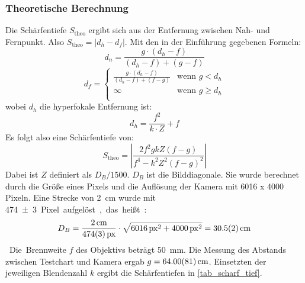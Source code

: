\documentclass[
	a4paper,
	12pt,
	pagesize,
	ngerman
]{scrartcl}
\begin{document}
	\subsubsection*{Theoretische Berechnung}
	Die Schärfentiefe $S_\text{theo}$ ergibt sich aus der Entfernung zwischen Nah- und Fernpunkt.
	Also $S_\text{theo}= |d_h - d_f|$.
	Mit den in der Einführung gegebenen Formeln: 
	\begin{equation}
		d_n = \frac{g\cdot (d_h-f)}{(d_h-f)+(g-f)}
	\end{equation}
	\begin{equation}
		d_f = 
		\begin{cases}
			\frac{g\cdot (d_h - f)}{(d_h-f)+(f-g)} & \text{wenn }  g < d_h \\
			\infty & \text{wenn }  g \geq d_h \\
		\end{cases}
		\label{eq_fernpunkt}
	\end{equation}
	wobei $d_h$ die hyperfokale Entfernung ist:
	\begin{equation}
		d_h = \frac{f^2}{k\cdot Z} + f
	\end{equation}
	Es folgt also eine Schärfentiefe von:
	\begin{equation}
		S_\text{theo} = \left| \frac{2f^2 g k Z (f-g)}{f^4-k^2 Z^2 (f-g)^2} \right|
		\label{eq_scharf_tief}
	\end{equation}
	Dabei ist $Z$ definiert als $D_B/1500$. 
	$D_B$ ist die Bilddiagonale. 
	Sie wurde berechnet durch die Größe eines Pixels und die Auflösung der Kamera mit 6016 x 4000 Pixeln.
	Eine Strecke von \SI{2}{cm} wurde mit \SI{474+-3} Pixel aufgelöst, das heißt:
	\begin{equation}
		D_B = \frac{\SI{2}{cm}}{\SI{474+-3}{px}}\cdot \sqrt{\SI{6016}{px}^2+\SI{4000}{px}^2} = \SI{30,5+-0,2}{cm}
	\end{equation}
	Die Brennweite $f$ des Objektivs beträgt \SI{50}{mm}.
	Die Messung des Abstands zwischen Testchart und Kamera ergab $g=\SI{64+-0,81}{cm}$.
	Einsetzten der jeweiligen Blendenzahl $k$ ergibt die Schärfentiefen in \cref{tab_scharf_tief}.
\end{document}

